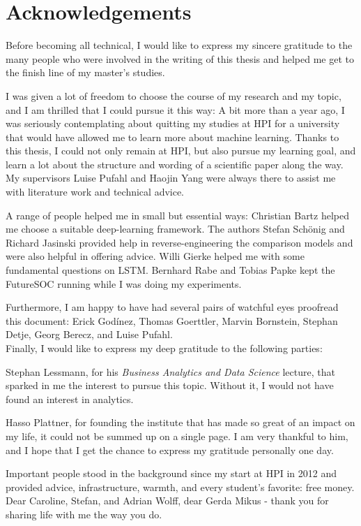 
\begingroup

\let\clearpage\relax
\let\cleardoublepage\relax
\let\cleardoublepage\relax

\chapter*{Acknowledgements}
Before becoming all technical, I would like to express my sincere gratitude to the many people who were involved in the writing of this thesis and helped me get to the finish line of my master's studies.

I was given a lot of freedom to choose the course of my research and my topic, and I am thrilled that I could pursue it this way:
A bit more than a year ago,  I was seriously contemplating about quitting my studies at HPI for a university that would have allowed me to learn more about machine learning.
Thanks to this thesis, I could not only remain at HPI, but also pursue my learning goal, and learn a lot about the structure and wording of a scientific paper along the way. My supervisors Luise Pufahl and Haojin Yang were always there to assist me with literature work and technical advice.

A range of people helped me in small but essential ways:
Christian Bartz helped me choose a suitable deep-learning framework.
The authors Stefan Schönig and Richard Jasinski provided help in reverse-engineering the comparison models and were also helpful in offering advice.
Willi Gierke helped me with some fundamental questions on LSTM.
Bernhard Rabe and Tobias Papke kept the FutureSOC running while I was doing my experiments.

Furthermore, I am happy to have had several pairs of watchful eyes proofread this document:
Erick Godínez, Thomas Goerttler, Marvin Bornstein, Stephan Detje, Georg Berecz, and Luise Pufahl.\\

Finally, I would like to express my deep gratitude to the following parties:

Stephan Lessmann, for his \textit{Business Analytics and Data Science} lecture, that sparked in me the interest to pursue this topic. Without it, I would not have found an interest in analytics.

Hasso Plattner, for founding the institute that has made so great of an impact on my life, it could not be summed up on a single page.
I am very thankful to him, and I hope that I get the chance to express my gratitude personally one day.

Important people stood in the background since my start at HPI in 2012 and provided advice, infrastructure, warmth, and every student's favorite: free money. Dear Caroline, Stefan, and Adrian Wolff, dear Gerda Mikus - thank you for sharing life with me the way you do.
\endgroup
